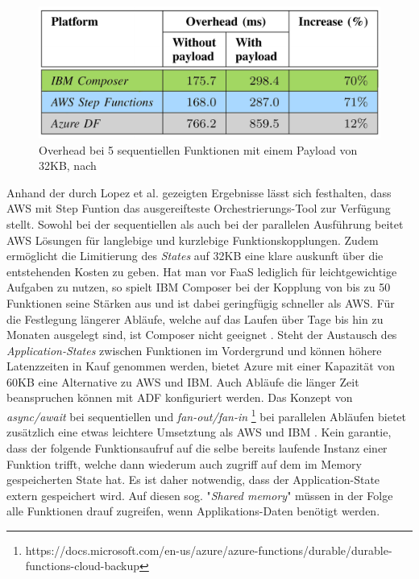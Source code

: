 \documentclass[11pt]{article}
\begin{document}
\begin{figure}[H]
\caption{Overhead bei 5 sequentiellen Funktionen mit einem Payload von 32KB, nach \cite{lopez2018comparison}}
\label{fig:orchestration}
\centering
\includegraphics[width=1\textwidth]{Orchestration}
\end{figure} 
Anhand der durch Lopez et al. gezeigten Ergebnisse lässt sich festhalten, dass AWS mit Step Funtion das ausgereifteste Orchestrierungs-Tool zur Verfügung stellt. Sowohl bei der sequentiellen als auch bei der parallelen Ausführung beitet AWS Lösungen für langlebige und kurzlebige Funktionskopplungen. Zudem ermöglicht die Limitierung des \textit{States} auf 32KB eine klare auskunft über die entstehenden Kosten zu geben. Hat man vor FaaS lediglich für leichtgewichtige Aufgaben zu nutzen, so spielt IBM Composer bei der Kopplung von bis zu 50 Funktionen seine Stärken aus und ist dabei geringfügig schneller als AWS. Für die Festlegung längerer Abläufe, welche auf das Laufen über Tage bis hin zu Monaten ausgelegt sind, ist Composer nicht geeignet \cite{lopez2018comparison}. Steht der Austausch des \textit{Application-States} zwischen Funktionen im Vordergrund und können höhere Latenzzeiten in Kauf genommen werden, bietet Azure mit einer Kapazität von 60KB eine Alternative zu AWS und IBM. Auch Abläufe die länger Zeit beanspruchen können mit ADF konfiguriert werden. Das Konzept von \textit{async/await} bei sequentiellen und \textit{fan-out/fan-in} \footnote{https://docs.microsoft.com/en-us/azure/azure-functions/durable/durable-functions-cloud-backup} bei parallelen Abläufen bietet zusätzlich eine etwas leichtere Umsetztung als AWS und IBM \cite{lopez2018comparison}.
Kein garantie, dass der folgende Funktionsaufruf auf die selbe bereits laufende Instanz einer Funktion trifft, welche dann wiederum auch zugriff auf dem im Memory gespeicherten State hat. Es ist daher notwendig, dass der Application-State extern gespeichert wird. Auf diesen sog. "\textit{Shared memory}" müssen in der Folge alle Funktionen drauf zugreifen, wenn Applikations-Daten benötigt werden.
\end{document}
